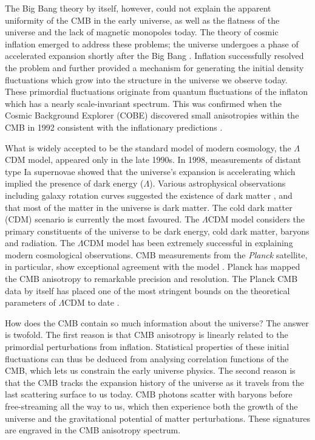 The Big Bang theory by itself, however, could not explain the apparent uniformity of the CMB in the early universe, as well as the flatness of the universe and the lack of magnetic monopoles today. The theory of cosmic inflation emerged to address these problems; the universe undergoes a phase of accelerated expansion shortly after the Big Bang \cite{Guth1981inflation}. Inflation successfully resolved the problem and further provided a mechanism for generating the initial density fluctuations which grow into the structure in the universe we observe today. These primordial fluctuations originate from quantum fluctuations of the inflaton which has a nearly scale-invariant spectrum. This was confirmed when the Cosmic Background Explorer (COBE) discovered small anisotropies within the CMB in 1992 consistent with the inflationary predictions \cite{Smoot1992cobe}.

What is widely accepted to be the standard model of modern cosmology, the $\Lambda$CDM model, appeared only in the late 1990s. In 1998, measurements of distant type Ia supernovae showed that the universe's expansion is accelerating \cite{Riess1998acceleration} which implied the presence of dark energy ($\Lambda$). Various astrophysical observations including galaxy rotation curves suggested the existence of dark matter \cite{Rubin1980rotationcurves}, and that most of the matter in the universe is dark matter. The cold dark matter (CDM) scenario is currently the most favoured. The $\Lambda$CDM model considers the primary constituents of the universe to be dark energy, cold dark matter, baryons and radiation. The $\Lambda$CDM model has been extremely successful in explaining modern cosmological observations. CMB measurements from the \textit{Planck} satellite, in particular, show exceptional agreement with the model \cite{PlanckCollaboration2018Parameters}. Planck has mapped the CMB anisotropy to remarkable precision and resolution. The Planck CMB data by itself has placed one of the most stringent bounds on the theoretical parameters of $\Lambda$CDM to date \cite{PlanckCollaboration2018Parameters,PlanckCollaboration2018inflation}.

How does the CMB contain so much information about the universe? The answer is twofold. The first reason is that CMB anisotropy is linearly related to the primordial perturbations from inflation. Statistical properties of these initial fluctuations can thus be deduced from analysing correlation functions of the CMB, which lets us constrain the early universe physics. The second reason is that the CMB tracks the expansion history of the universe as it travels from the last scattering surface to us today. CMB photons scatter with baryons before free-streaming all the way to us, which then experience both the growth of the universe and the gravitational potential of matter perturbations. These signatures are engraved in the CMB anisotropy spectrum.

